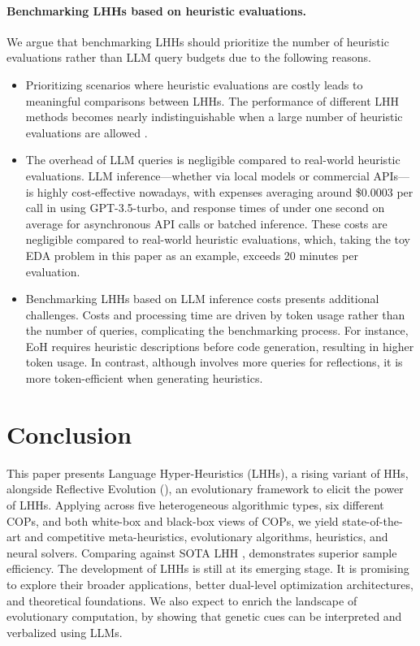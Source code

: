 \paragraph{Benchmarking LHHs based on heuristic evaluations.}
We argue that benchmarking LHHs should prioritize the number of heuristic evaluations rather than LLM query budgets \cite{zhang2024understanding} due to the following reasons. 
\begin{itemize}[left=10pt]
    \item Prioritizing scenarios where heuristic evaluations are costly leads to meaningful comparisons between LHHs. The performance of different LHH methods becomes nearly indistinguishable when a large number of heuristic evaluations are allowed \cite{zhang2024understanding}.
    
    \item The overhead of LLM queries is negligible compared to real-world heuristic evaluations. LLM inference—whether via local models or commercial APIs—is highly cost-effective nowadays, with expenses averaging around \$0.0003 per call in \our{} using GPT-3.5-turbo, and response times of under one second on average for asynchronous API calls or batched inference. These costs are negligible compared to real-world heuristic evaluations, which, taking the toy EDA problem in this paper as an example, exceeds 20 minutes per evaluation.

    \item Benchmarking LHHs based on LLM inference costs presents additional challenges. Costs and processing time are driven by token usage rather than the number of queries, complicating the benchmarking process. For instance, EoH \cite{liu2024_llm_gls} requires heuristic descriptions before code generation, resulting in higher token usage. In contrast, although \our{} involves more queries for reflections, it is more token-efficient when generating heuristics.
\end{itemize}



\section{Conclusion}\label{sec: conclusion and limitation}

This paper presents Language Hyper-Heuristics (LHHs), a rising variant of HHs, alongside Reflective Evolution (\our{}), an evolutionary framework to elicit the power of LHHs. Applying \our{} across five heterogeneous algorithmic types, six different COPs, and both white-box and black-box views of COPs, we yield state-of-the-art and competitive meta-heuristics, evolutionary algorithms, heuristics, and neural solvers. Comparing against SOTA LHH \cite{liu2024_llm_gls}, \our{} demonstrates superior sample efficiency. The development of LHHs is still at its emerging stage. It is promising to explore their broader applications, better dual-level optimization architectures, and theoretical foundations. We also expect \our{} to enrich the landscape of evolutionary computation, by showing that genetic cues can be interpreted and verbalized using LLMs.

\clearpage